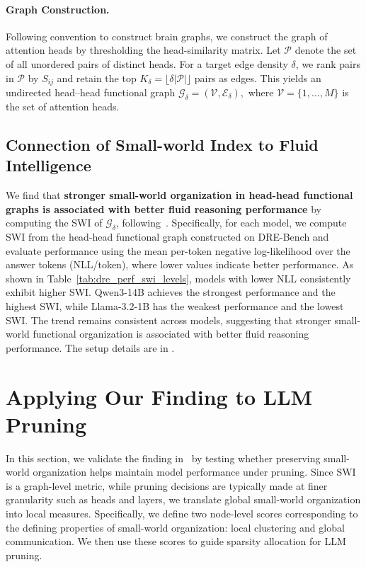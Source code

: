 \paragraph{Graph Construction.}
Following convention to construct brain graphs, we construct the graph of attention heads by thresholding the head-similarity matrix. Let $\mathcal{P}$ denote the set of all unordered pairs of distinct heads. For a target edge density $\delta$, we rank pairs in $\mathcal{P}$ by $S_{ij}$ and retain the top $K_\delta=\lfloor \delta |\mathcal{P}| \rfloor$ pairs as edges. This yields an undirected head--head functional graph
$
\mathcal{G}_\delta=(\mathcal{V},\mathcal{E}_\delta),
$
where $\mathcal{V}=\{1,\ldots,M\}$ is the set of attention heads.


\subsection{Connection of Small-world Index to Fluid Intelligence}
\label{sec:quantify_swi}
We find that \textbf{stronger small-world organization in head-head functional graphs is associated with better fluid reasoning performance} by computing the SWI of $\mathcal{G}_\delta$, following~. Specifically, for each model, we compute SWI from the head-head functional graph constructed on DRE-Bench and evaluate performance using the mean per-token negative log-likelihood over the answer tokens (NLL/token), where lower values indicate better performance. As shown in Table~\ref{tab:dre_perf_swi_levels}, models with lower NLL consistently exhibit higher SWI. Qwen3-14B achieves the strongest performance and the highest SWI, while Llama-3.2-1B has the weakest performance and the lowest SWI. The trend remains consistent across models, suggesting that stronger small-world functional organization is associated with better fluid reasoning performance. The setup details are in .






\section{Applying Our Finding to LLM Pruning}
\label{sec:core-bridge}
In this section, we validate the finding in~ by testing whether preserving small-world organization helps maintain model performance under pruning. Since SWI is a graph-level metric, while pruning decisions are typically made at finer granularity such as heads and layers, we translate global small-world organization into local measures. Specifically, we define two node-level scores corresponding to the defining properties of small-world organization: local clustering and global communication. We then use these scores to guide sparsity allocation for LLM pruning.


